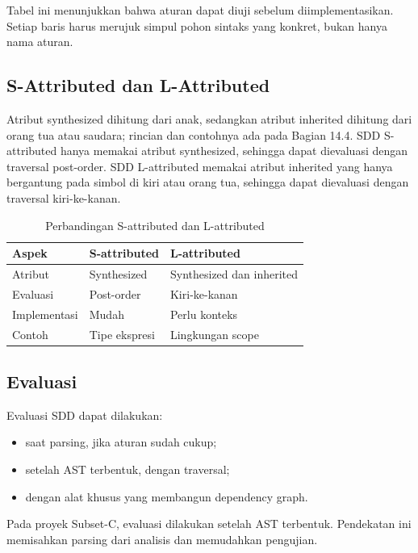 Tabel ini menunjukkan bahwa aturan dapat diuji sebelum
diimplementasikan. Setiap baris harus merujuk simpul pohon sintaks
yang konkret, bukan hanya nama aturan.

\subsection{S-Attributed dan L-Attributed}

Atribut synthesized dihitung dari anak, sedangkan atribut inherited
dihitung dari orang tua atau saudara; rincian dan contohnya ada pada
Bagian 14.4. SDD S-attributed hanya memakai atribut synthesized,
sehingga dapat dievaluasi dengan traversal post-order. SDD
L-attributed memakai atribut inherited yang hanya bergantung pada
simbol di kiri atau orang tua, sehingga dapat dievaluasi dengan
traversal kiri-ke-kanan.

\begin{table}[H]
\centering
\caption{Perbandingan S-attributed dan L-attributed}
\label{tab:ch14-s-l}
\begin{tabularx}{\textwidth}{@{}lXX@{}}
\toprule
\textbf{Aspek} & \textbf{S-attributed} & \textbf{L-attributed} \\
\midrule
Atribut & Synthesized & Synthesized dan inherited \\
Evaluasi & Post-order & Kiri-ke-kanan \\
Implementasi & Mudah & Perlu konteks \\
Contoh & Tipe ekspresi & Lingkungan scope \\
\bottomrule
\end{tabularx}
\end{table}

\subsection{Evaluasi}

Evaluasi SDD dapat dilakukan:
\begin{itemize}[leftmargin=*]
  \item saat parsing, jika aturan sudah cukup;
  \item setelah AST terbentuk, dengan traversal;
  \item dengan alat khusus yang membangun dependency graph.
\end{itemize}

Pada proyek Subset-C, evaluasi dilakukan setelah AST terbentuk.
Pendekatan ini memisahkan parsing dari analisis dan memudahkan
pengujian.
